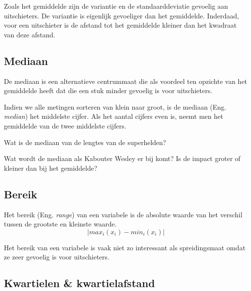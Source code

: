 Zoals het gemiddelde zijn de variantie en de standaarddeviatie gevoelig aan uitschieters. De variantie is eigenlijk gevoeliger dan het gemiddelde. Inderdaad, voor een uitschieter is de afstand tot het gemiddelde kleiner dan het kwadraat van deze afstand. %

\subsection{Mediaan}

De mediaan is een alternatieve centrummaat die als voordeel ten opzichte van het gemiddelde heeft dat die een stuk minder gevoelig is voor uitschieters.

\begin{definition}[Mediaan]
  Indien we alle metingen sorteren van klein naar groot, is de  mediaan (Eng. \emph{median}) het middelste cijfer. Als het aantal cijfers even is, neemt men het gemiddelde van de twee middelste cijfers.
\end{definition}

\begin{exercise}
  Wat is de mediaan van de lengtes van de superhelden?
\end{exercise}

\begin{exercise}
  Wat wordt de mediaan als Kabouter Wesley er bij komt? Is de impact groter of kleiner dan bij het gemiddelde?
\end{exercise}

\subsection{Bereik}

\begin{definition}[Bereik]
  Het bereik (Eng. \emph{range}) van een variabele is de absolute waarde van het verschil tussen de grootste en kleinste waarde.
  \begin{equation}
    | max_i(x_i) - min_i(x_i) |
  \end{equation}
\end{definition}

Het bereik van een variabele is vaak niet zo interessant als spreidingsmaat omdat ze zeer gevoelig is voor uitschieters.

\subsection{Kwartielen \& kwartielafstand}

